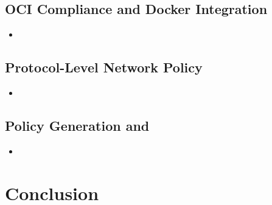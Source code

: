 \subsection{OCI Compliance and Docker Integration}

\begin{inprogress}
  \begin{itemize}
    \item
  \end{itemize}
\end{inprogress}

\subsection{Protocol-Level Network Policy}

\begin{inprogress}
  \begin{itemize}
    \item
  \end{itemize}
\end{inprogress}

\subsection{\bpfcontain{} Policy Generation and }

\begin{inprogress}
  \begin{itemize}
    \item
  \end{itemize}
\end{inprogress}



\section{Conclusion}
\label{s:disc-conclusion}

